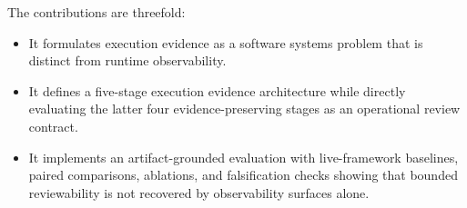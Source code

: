 The contributions are threefold:

\begin{itemize}
  \item It formulates execution evidence as a software systems problem that is distinct from runtime observability.
  \item It defines a five-stage execution evidence architecture while directly evaluating the latter four evidence-preserving stages as an operational review contract.
  \item It implements an artifact-grounded evaluation with live-framework baselines, paired comparisons, ablations, and falsification checks showing that bounded reviewability is not recovered by observability surfaces alone.
\end{itemize}
